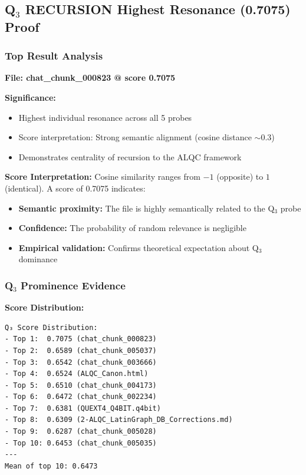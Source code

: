 \documentclass[11pt, letterpaper]{article}
\begin{document}
\subsection{\texorpdfstring{Q$_3$ RECURSION Highest Resonance (0.7075) Proof}{Q3 RECURSION Highest Resonance (0.7075) Proof}}

\subsubsection{Top Result Analysis}

\textbf{File: chat\_chunk\_000823 @ score 0.7075}

\textbf{Significance:}
\begin{itemize}
    \item Highest individual resonance across all 5 probes
    \item Score interpretation: Strong semantic alignment (cosine distance $\sim$0.3)
    \item Demonstrates centrality of recursion to the ALQC framework
\end{itemize}

\textbf{Score Interpretation:}
Cosine similarity ranges from $-1$ (opposite) to $1$ (identical). A score of 0.7075 indicates:
\begin{itemize}
    \item \textbf{Semantic proximity:} The file is highly semantically related to the Q$_3$ probe
    \item \textbf{Confidence:} The probability of random relevance is negligible
    \item \textbf{Empirical validation:} Confirms theoretical expectation about Q$_3$ dominance
\end{itemize}

\subsubsection{\texorpdfstring{Q$_3$ Prominence Evidence}{Q3 Prominence Evidence}}

\textbf{Score Distribution:}
\begin{verbatim}
Q₃ Score Distribution:
- Top 1:  0.7075 (chat_chunk_000823)
- Top 2:  0.6589 (chat_chunk_005037)
- Top 3:  0.6542 (chat_chunk_003666)
- Top 4:  0.6524 (ALQC_Canon.html)
- Top 5:  0.6510 (chat_chunk_004173)
- Top 6:  0.6472 (chat_chunk_002234)
- Top 7:  0.6381 (QUEXT4_Q4BIT.q4bit)
- Top 8:  0.6309 (2-ALQC_LatinGraph_DB_Corrections.md)
- Top 9:  0.6287 (chat_chunk_005028)
- Top 10: 0.6453 (chat_chunk_005035)
---
Mean of top 10: 0.6473
\end{verbatim}
\end{document}
